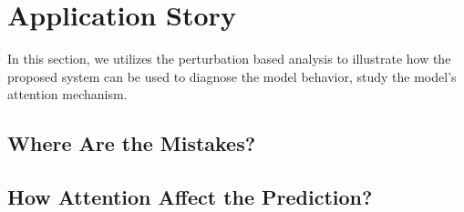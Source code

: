 \section{Application Story}
\label{sec:caseStudy}


In this section, we utilizes the perturbation based analysis
to illustrate how the proposed system can be used
to diagnose the model behavior, study the model's attention mechanism.

\subsection{Where Are the Mistakes?}


\subsection{How Attention Affect the Prediction?}


